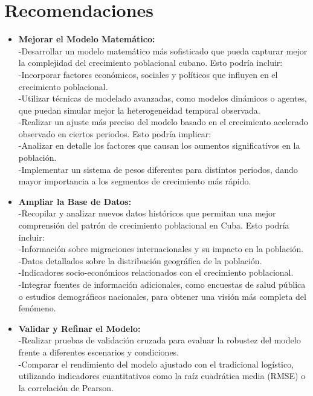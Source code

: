 \documentclass[a4paper,10pt,twocolumn]{article}
\begin{document}
\section{Recomendaciones}\label{sec:rec}
\begin{itemize}
	\item \textbf{Mejorar el Modelo Matemático:}\\
-Desarrollar un modelo matemático más sofisticado que pueda capturar mejor la complejidad del crecimiento poblacional cubano. Esto podría incluir:\\
-Incorporar factores económicos, sociales y políticos que influyen en el crecimiento poblacional.\\
-Utilizar técnicas de modelado avanzadas, como modelos dinámicos o agentes, que puedan simular mejor la heterogeneidad temporal observada.\\
-Realizar un ajuste más preciso del modelo basado en el crecimiento acelerado observado en ciertos periodos. Esto podría implicar:\\
-Analizar en detalle los factores que causan los aumentos significativos en la población.\\
-Implementar un sistema de pesos diferentes para distintos periodos, dando mayor importancia a los segmentos de crecimiento más rápido.
	\item \textbf{Ampliar la Base de Datos:}\\ 
-Recopilar y analizar nuevos datos históricos que permitan una mejor comprensión del patrón de crecimiento poblacional en Cuba. Esto podría incluir:\\
-Información sobre migraciones internacionales y su impacto en la población.\\
-Datos detallados sobre la distribución geográfica de la población.\\
-Indicadores socio-económicos relacionados con el crecimiento poblacional.\\
-Integrar fuentes de información adicionales, como encuestas de salud pública o estudios demográficos nacionales, para obtener una visión más completa del fenómeno.
	\item \textbf{Validar y Refinar el Modelo:}\\ 
-Realizar pruebas de validación cruzada para evaluar la robustez del modelo frente a diferentes escenarios y condiciones.\\
-Comparar el rendimiento del modelo ajustado con el tradicional logístico, utilizando indicadores cuantitativos como la raíz cuadrática media (RMSE) o la correlación de Pearson.\\

\end{itemize}
\end{document}
